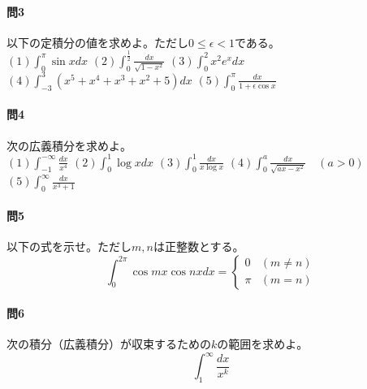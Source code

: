 \documentclass[a4j,dvipdfmx]{jsarticle}
\begin{document}
                \paragraph{問3}以下の定積分の値を求めよ。ただし$0\leq \epsilon < 1$である。\\
                $(1)\displaystyle \int_{0}^{\pi}\sin x dx$\hspace{3mm}%
                $(2)\displaystyle \int_{0}^{\frac{1}{2}}\frac{dx}{\sqrt{1-x^2}}$\hspace{3mm}
                $(3)\displaystyle \int_0^2 x^2e^{x}dx$\hspace{3mm}
                $(4)\displaystyle \int_{-3}^3\left(x^5+x^4+x^3+x^2+5\right)dx$\hspace{3mm}
                $(5)\displaystyle \int_0^\pi \frac{dx}{1+\epsilon\cos x}$

                \paragraph{問4}次の広義積分を求めよ。\\
                $(1)\displaystyle \int_{-1}^{-\infty}\frac{dx}{x^4}$\hspace{3mm}
                $(2)\displaystyle \int_0^1 \log xdx$\hspace{3mm}
                $(3)\displaystyle \int_0^1 \frac{dx}{x\log x}$\hspace{3mm}
                $(4)\displaystyle \int_0^a \frac{dx}{\sqrt{ax-x^2}}\quad(a>0)$\hspace{3mm}
                $(5)\displaystyle \int_0^\infty \frac{dx}{x^3+1}$

                \paragraph{問5}以下の式を示せ。ただし$m,n$は正整数とする。
                \begin{equation*}
                    \int_{0}^{2\pi}\cos mx\cos nx dx = \begin{cases}
                        0 & (m\neq n)\\ \pi & (m=n)
                    \end{cases}
                \end{equation*}

                \paragraph{問6}次の積分（広義積分）が収束するための$k$の範囲を求めよ。
                \begin{equation*}
                    \int_1^\infty \frac{dx}{x^{k}}
                \end{equation*}
\end{document}

